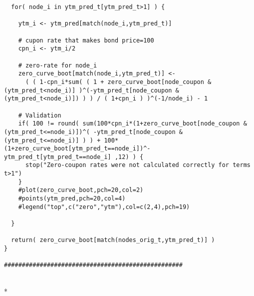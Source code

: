 \documentclass[letterpaper,10pt,english]{/anaconda/lib/python2.7/site-packages/sphinx/texinputs/sphinxhowto}
\def\smaller{\fontsize{9.5pt}{9.5pt}\selectfont}
\newenvironment{ColorVerbatim}
        {\begin{mdframed}[%
            roundcorner=1.0pt, %
            backgroundcolor=nbframe-bg, %
            userdefinedwidth=1\linewidth, %
            leftmargin=0.1\linewidth, %
            innerleftmargin=0pt, %
            innerrightmargin=0pt, %
            linecolor=nbframe-border, %
            linewidth=1pt, %
            usetwoside=false, %
            everyline=true, %
            innerlinewidth=3pt, %
            innerlinecolor=nbframe-bg, %
            middlelinewidth=1pt, %
            middlelinecolor=nbframe-bg, %
            outerlinewidth=0.5pt, %
            outerlinecolor=nbframe-border, %
            needspace=0pt
        ]}
        {\end{mdframed}}
\renewenvironment{Verbatim}[1][\unskip]
        {\begin{alltt}\smaller}
        {\end{alltt}}
\begin{document}
\begin{verbatim}
  for( node_i in ytm_pred_t[ytm_pred_t>1] ) {
    
    ytm_i <- ytm_pred[match(node_i,ytm_pred_t)]
    
    # cupon rate that makes bond price=100
    cpn_i <- ytm_i/2
    
    # zero-rate for node_i
    zero_curve_boot[match(node_i,ytm_pred_t)] <-    
      ( ( 1-cpn_i*sum( ( 1 + zero_curve_boot[node_coupon & (ytm_pred_t<node_i)] )^(-ytm_pred_t[node_coupon & (ytm_pred_t<node_i)]) ) ) / ( 1+cpn_i ) )^(-1/node_i) - 1
    
    # Validation
    if( 100 != round( sum(100*cpn_i*(1+zero_curve_boot[node_coupon & (ytm_pred_t<=node_i)])^( -ytm_pred_t[node_coupon & (ytm_pred_t<=node_i)] ) ) + 100*(1+zero_curve_boot[ytm_pred_t==node_i])^-ytm_pred_t[ytm_pred_t==node_i] ,12) ) {
      stop("Zero-coupon rates were not calculated correctly for terms t>1")
    }
    #plot(zero_curve_boot,pch=20,col=2)
    #points(ytm_pred,pch=20,col=4)
    #legend("top",c("zero","ytm"),col=c(2,4),pch=19)
    
  }
  
  return( zero_curve_boot[match(nodes_orig_t,ytm_pred_t)] )
}

##################################################
\end{verbatim}


    
        \vspace{6pt}
        \makebox[0.1\linewidth]{\smaller\hfill\tt\color{nbframe-in-prompt}In\hspace{4pt}{[}{]}:\hspace{4pt}}\\*
        \vspace{-2.65\baselineskip}
        \begin{ColorVerbatim}
            \vspace{-0.7\baselineskip}
            \begin{Verbatim}[commandchars=\\\{\}]

\end{Verbatim}

            
                \vspace{0.3\baselineskip}
            
        \end{ColorVerbatim}
    

        

        \renewcommand{\indexname}{Index}
        \printindex

    
\end{document}
